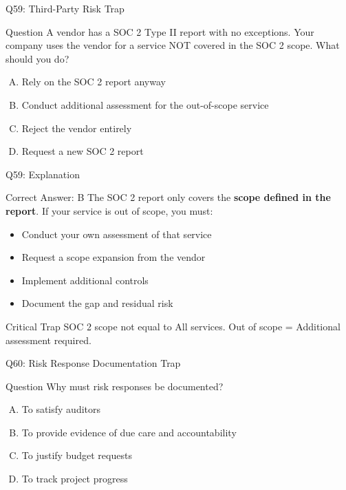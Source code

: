 \documentclass{beamer}
\begin{document}
	\begin{frame}{Q59: Third-Party Risk Trap}
		\begin{block}{Question}
			A vendor has a SOC 2 Type II report with no exceptions. Your company uses the vendor for a service NOT covered in the SOC 2 scope. What should you do?
		\end{block}
		\begin{enumerate}[(A)]
			\item Rely on the SOC 2 report anyway
			\item Conduct additional assessment for the out-of-scope service
			\item Reject the vendor entirely
			\item Request a new SOC 2 report
		\end{enumerate}
	\end{frame}
	
	\begin{frame}{Q59: Explanation}
		\begin{block}{Correct Answer: B}
			The SOC 2 report only covers the \textbf{scope defined in the report}. If your service is out of scope, you must:
			\begin{itemize}
				\item Conduct your own assessment of that service
				\item Request a scope expansion from the vendor
				\item Implement additional controls
				\item Document the gap and residual risk
			\end{itemize}
		\end{block}
		\begin{alertblock}{Critical Trap}
			SOC 2 scope not equal to All services.
			Out of scope = Additional assessment required.
		\end{alertblock}
	\end{frame}
	
	\begin{frame}{Q60: Risk Response Documentation Trap}
		\begin{block}{Question}
			Why must risk responses be documented?
		\end{block}
		\begin{enumerate}[(A)]
			\item To satisfy auditors
			\item To provide evidence of due care and accountability
			\item To justify budget requests
			\item To track project progress
		\end{enumerate}
	\end{frame}
	
\end{document}
